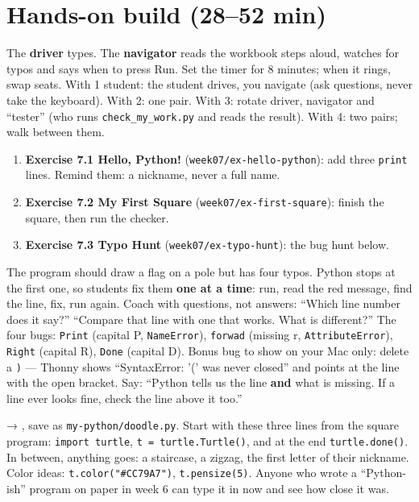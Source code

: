 \section{Hands-on build (28--52 min)}
\begin{pairroles}
The \textbf{driver} types. The \textbf{navigator} reads the workbook steps aloud, watches for typos and says when to press Run. Set the timer for 8 minutes; when it rings, swap seats.
With 1 student: the student drives, you navigate (ask questions, never take the keyboard). With 2: one pair. With 3: rotate driver, navigator and \enquote{tester} (who runs \texttt{check\_my\_work.py} and reads the result). With 4: two pairs; walk between them.
\end{pairroles}
\begin{enumerate}[leftmargin=1.4em,itemsep=2pt]
  \item \textbf{Exercise 7.1 Hello, Python!} (\texttt{week07/ex-hello-python}): add three \texttt{print} lines. Remind them: a nickname, never a full name.
  \item \textbf{Exercise 7.2 My First Square} (\texttt{week07/ex-first-square}): finish the square, then run the checker.
  \item \textbf{Exercise 7.3 Typo Hunt} (\texttt{week07/ex-typo-hunt}): the bug hunt below.
\end{enumerate}
\begin{bughunt}
The program should draw a flag on a pole but has four typos. Python stops at the first one, so students fix them \textbf{one at a time}: run, read the red message, find the line, fix, run again.
Coach with questions, not answers: \enquote{Which line number does it say?} \enquote{Compare that line with one that works. What is different?}
The four bugs: \texttt{Print} (capital P, \texttt{NameError}), \texttt{forwad} (missing r, \texttt{AttributeError}), \texttt{Right} (capital R), \texttt{Done} (capital D). Bonus bug to show on your Mac only: delete a \texttt{)} --- Thonny shows \enquote{SyntaxError: '(' was never closed} and points at the line with the open bracket. Say: \enquote{Python tells us the line \textbf{and} what is missing. If a line ever looks fine, check the line above it too.}
\end{bughunt}
\begin{freebuild}
 → , save as \texttt{my-python/doodle.py}. Start with these three lines from the square program: \texttt{import turtle}, \texttt{t = turtle.Turtle()}, and at the end \texttt{turtle.done()}. In between, anything goes: a staircase, a zigzag, the first letter of their nickname. Color ideas: \texttt{t.color("\#CC79A7")}, \texttt{t.pensize(5)}. Anyone who wrote a \enquote{Python-ish} program on paper in week 6 can type it in now and see how close it was.
\end{freebuild}

